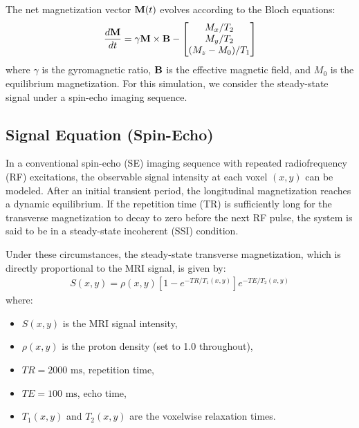 \documentclass[10pt,a4paper,twoside]{article}
\begin{document}
The net magnetization vector \(\vb{M}(t)\) evolves according to the Bloch equations:
\begin{align}
\frac{d\vb{M}}{dt} = \gamma \vb{M} \times \vb{B} - 
\begin{bmatrix}
    M_x / T_2 \\
    M_y / T_2 \\
    (M_z - M_0)/ T_1
\end{bmatrix}
\end{align}
where \( \gamma \) is the gyromagnetic ratio, \( \vb{B} \) is the effective magnetic field, and \( M_0 \) is the equilibrium magnetization. For this simulation, we consider the steady-state signal under a spin-echo imaging sequence.

\subsection{Signal Equation (Spin-Echo)}

In a conventional spin-echo (SE) imaging sequence with repeated radiofrequency (RF) excitations, the observable signal intensity at each voxel $(x, y)$ can be modeled. After an initial transient period, the longitudinal magnetization reaches a dynamic equilibrium. If the repetition time (TR) is sufficiently long for the transverse magnetization to decay to zero before the next RF pulse, the system is said to be in a steady-state incoherent (SSI) condition. 

Under these circumstances, the steady-state transverse magnetization, which is directly proportional to the MRI signal, is given by:
\begin{align}
    S(x, y) = \rho(x, y) \left[ 1 - e^{-TR / T_1(x, y)} \right] e^{-TE / T_2(x, y)}
\end{align}
where:
\begin{itemize}
    \item \(S(x, y)\) is the MRI signal intensity,
    \item \(\rho(x, y)\) is the proton density (set to 1.0 throughout),
    \item \(TR = 2000 \text{ ms}\), repetition time,
    \item \(TE = 100 \text{ ms}\), echo time,
    \item \(T_1(x, y)\) and \(T_2(x, y)\) are the voxelwise relaxation times.
\end{itemize}
\end{document}
